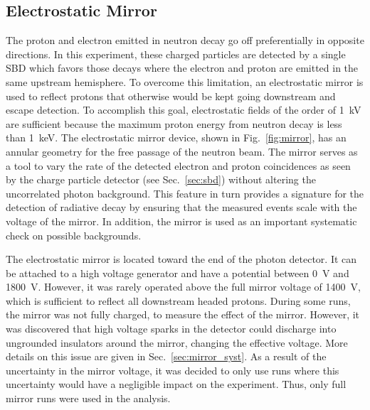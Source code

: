 \documentclass[oneside,12pt]{memoir}
\begin{document}
\subsection{Electrostatic Mirror}
\label{sec:mirror}
The proton and electron emitted in neutron decay go off preferentially in opposite directions. In this experiment, these charged particles are detected by a single SBD which favors those decays where the electron and proton are emitted in the same upstream hemisphere. To overcome this limitation, an electrostatic mirror is used to reflect protons that otherwise would be kept going downstream and escape detection. To accomplish this goal, electrostatic fields of the order of 1~kV are sufficient because the maximum proton energy from neutron decay is less than 1~keV. The electrostatic mirror device, shown in Fig.~\ref{fig:mirror}, has an annular geometry for the free passage of the neutron beam. The mirror serves as a tool to vary the rate of the detected electron and proton coincidences as seen by the charge particle detector (see Sec.~\ref{sec:sbd}) without altering the uncorrelated photon background. This feature in turn provides a signature for the detection of radiative decay by ensuring that the measured events scale with the voltage of the mirror. In addition, the mirror is used as an important systematic check on possible backgrounds.\par
The electrostatic mirror is located toward the end of the photon detector. It can be attached to a high voltage generator and have a potential between 0~V and 1800~V. However, it was rarely operated above the full mirror voltage of 1400~V, which is sufficient to reflect all downstream headed protons. During some runs, the mirror was not fully charged, to measure the effect of the mirror. However, it was discovered that high voltage sparks in the detector could discharge into ungrounded insulators around the mirror, changing the effective voltage. More details on this issue are given in Sec.~\ref{sec:mirror_syst}. As a result of the uncertainty in the mirror voltage, it was decided to only use runs where this uncertainty would have a negligible impact on the experiment. Thus, only full mirror runs were used in the analysis.\par
\end{document}
